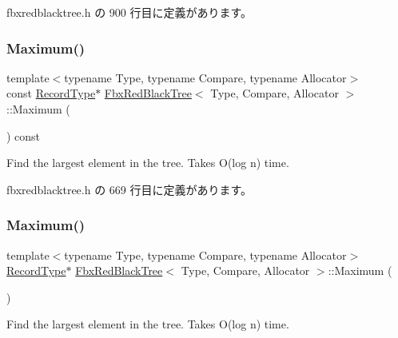  fbxredblacktree.\+h の 900 行目に定義があります。

\mbox{\label{class_fbx_red_black_tree_ab4cbb7bbe5fab913a8296708a5b222ed}} 
\subsubsection{\texorpdfstring{Maximum()}{Maximum()}\hspace{0.1cm}{\footnotesize\ttfamily [1/2]}}
{\footnotesize\ttfamily template$<$typename Type, typename Compare, typename Allocator$>$ \\
const \hyperlink{class_fbx_red_black_tree_1_1_record_type}{Record\+Type}$\ast$ \hyperlink{class_fbx_red_black_tree}{Fbx\+Red\+Black\+Tree}$<$ Type, Compare, Allocator $>$\+::Maximum (\begin{DoxyParamCaption}{ }\end{DoxyParamCaption}) const\hspace{0.3cm}{\ttfamily [inline]}}

Find the largest element in the tree. Takes O(log n) time. 

 fbxredblacktree.\+h の 669 行目に定義があります。

\mbox{\label{class_fbx_red_black_tree_a03b6f025d8466c40949f87a65c24e92e}} 
\subsubsection{\texorpdfstring{Maximum()}{Maximum()}\hspace{0.1cm}{\footnotesize\ttfamily [2/2]}}
{\footnotesize\ttfamily template$<$typename Type, typename Compare, typename Allocator$>$ \\
\hyperlink{class_fbx_red_black_tree_1_1_record_type}{Record\+Type}$\ast$ \hyperlink{class_fbx_red_black_tree}{Fbx\+Red\+Black\+Tree}$<$ Type, Compare, Allocator $>$\+::Maximum (\begin{DoxyParamCaption}{ }\end{DoxyParamCaption})\hspace{0.3cm}{\ttfamily [inline]}}

Find the largest element in the tree. Takes O(log n) time. 

